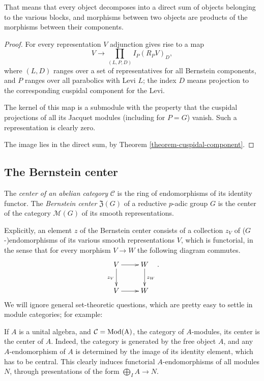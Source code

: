 That means that every object decomposes into a direct sum of objects belonging to the various blocks, and morphisms between two objects are products of the morphisms between their components. 

\begin{proof}
 For every representation $V$ adjunction gives rise to a map 
 $$ V\to \prod_{(L,P,D)} I_P (R_PV)_D,$$
 where $(L,D)$ ranges over a set of representatives for all Bernstein components, and $P$ ranges over all parabolics with Levi $L$; the index $D$ means projection to the corresponding cuspidal component for the Levi. 
 
 The kernel of this map is a submodule with the property that the cuspidal projections of all its Jacquet modules (including for $P=G$) vanish. Such a representation is clearly zero. 
 
 The image lies in the direct sum, by Theorem \ref{theorem-cuspidal-component}.
\end{proof}

\subsection{The Bernstein center}
   \label{subsection-Bernstein-center}

\begin{definition}
	\label{definition-Bernstein-center}
The {\it center of an abelian category} $\mathcal C$ is the ring of endomorphisms of its identity functor. The {\it Bernstein center} $\mathfrak Z(G)$ of a reductive $p$-adic group $G$ is the center of the category $\mathcal M(G)$ of its smooth representations.
\end{definition}

Explicitly, an element $z$ of the Bernstein center consists of a collection $z_V$ of ($G$-)endomorphisms of its various smooth representations $V$, which is functorial, in the sense that for every morphism $V\to W$ the following diagram commutes.
$$ \xymatrix{V \ar[r] \ar[d]_{z_V} &W \ar[d]^{z_W} \\ V \ar[r]& W}.$$
We will ignore general set-theoretic questions, which are pretty easy to settle in module categories; for example:

\begin{example}
	\label{example-center-modulecategory}
	If $A$ is a unital algebra, and $\mathcal C = \rm{Mod}(A)$, the category of $A$-modules, its center is the center of $A$. Indeed, the category is generated by the free object $A$, and any $A$-endomorphism of $A$ is determined by the image of its identity element, which has to be central. This clearly induces functorial $A$-endomorphisms of all modules $N$, through presentations of the form $\bigoplus_I A\to N$.
\end{example}

